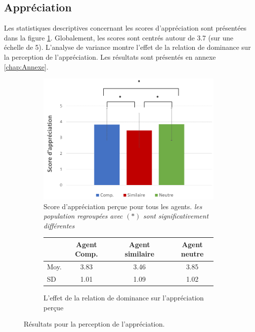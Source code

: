 	\subsection{Appréciation}
		Les statistiques descriptives concernant les scores d’appréciation sont présentées dans la figure \ref{fig:app}. Globalement,
		les scores sont centrés autour de 3.7 (sur une échelle de 5). L'analyse de variance montre l'effet de la relation de dominance sur la perception de l'appréciation. Les résultats sont présentés en annexe \ref{chap:Annexe}.
		
			\begin{figure}[h]
			
			\begin{subfigure}[h]{0.8\textwidth}
				\centering
				\includegraphics[clip=false]{Figures/chap7/appreciation.PNG}
				\caption{ Score d'appréciation perçue pour tous les agents. \textit{les population regroupées avec $(*)$ sont significativement différentes }}
			\end{subfigure}
			
			\begin{subfigure}[h]{0.8\textwidth}
				
				\centering
				\begin{tabular}{ l c c c c c }
					\hline
					\textbf{ }& \textbf{Agent Comp.} & &  \textbf{Agent similaire} & & \textbf{Agent neutre} \\ 
					\hline
					\newline Moy. & 3.83 & &3.46 & & 3.85 \\
					\newline SD & 1.01 & & 1.09& &  1.02 \\
					\hline
					
				\end{tabular}
				\caption{L'effet de la relation de dominance sur l'appréciation perçue} 
			\end{subfigure}
			\caption{Résultats pour la perception de l'appréciation.}
			\label{fig:app}
		\end{figure}
		
